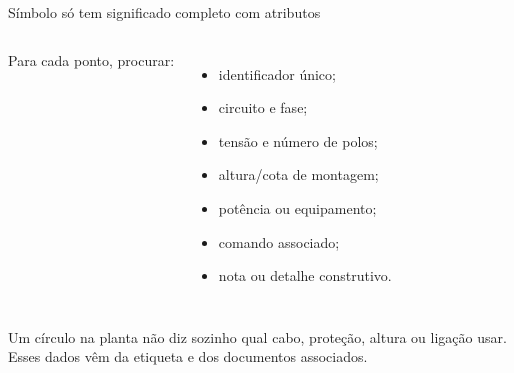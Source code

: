 \begin{frame}{Símbolo só tem significado completo com atributos}
\small
\begin{columns}[T,onlytextwidth]
Para cada ponto, procurar:
\begin{itemize}
\item identificador único;
\item circuito e fase;
\item tensão e número de polos;
\item altura/cota de montagem;
\item potência ou equipamento;
\item comando associado;
\item nota ou detalhe construtivo.
\end{itemize}
\end{columns}
\begin{caixaAt}
Um círculo na planta não diz sozinho qual cabo, proteção, altura ou ligação usar. Esses dados vêm da etiqueta e dos documentos associados.
\end{caixaAt}
\end{frame}

